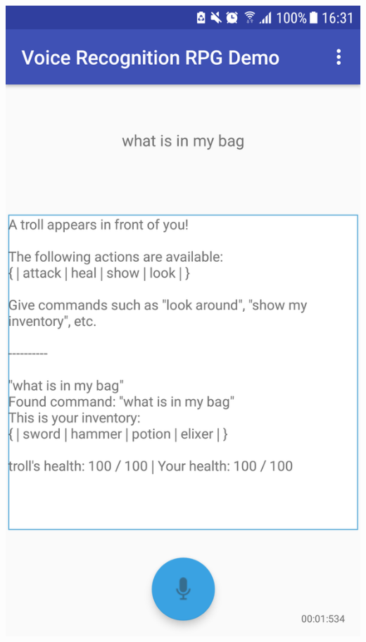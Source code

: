 \documentclass[11pt]{article}
\begin{document}
\begin{center}
\includegraphics[scale=0.18]{battle-1.png}

\end{center}
\end{document}
